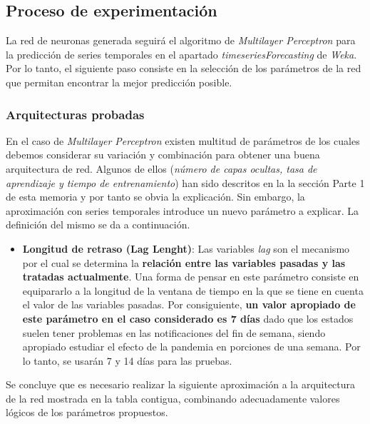 \documentclass[12pt,a4paper, xcolor=table]{article}
\begin{document}
    \subsection{Proceso de experimentación}
    La red de neuronas generada seguirá el algoritmo de \textit{Multilayer Perceptron }para la predicción de series temporales en el apartado \textit{timeseriesForecasting} de \textit{Weka}. Por lo tanto, el siguiente paso consiste en la selección de los parámetros de la red que permitan encontrar la mejor predicción posible.
    
        \subsubsection{Arquitecturas probadas}
    
        En el caso de \textit{Multilayer Perceptron } existen multitud de parámetros de los cuales debemos considerar su variación y combinación para obtener una buena arquitectura de red. Algunos de ellos (\textit{número de capas ocultas, tasa de aprendizaje y tiempo de entrenamiento}) han sido descritos en la la sección Parte 1 de esta memoria y por tanto se obvia la explicación. Sin embargo, la aproximación con series temporales introduce un nuevo parámetro a explicar. La definición del mismo se da a continuación.
    
        \begin{itemize}
        \item \textbf{Longitud de retraso (Lag Lenght)}: Las variables \textit{lag} son el mecanismo por el cual se determina la \textbf{relación entre las variables pasadas y las tratadas actualmente}. Una forma de pensar en este parámetro consiste en equipararlo a la longitud de la ventana de tiempo en la que se tiene en cuenta el valor de las variables pasadas. Por consiguiente, \textbf{un valor apropiado de este parámetro en el caso considerado es 7 días} dado que los estados suelen tener problemas en las notificaciones del fin de semana, siendo apropiado estudiar el efecto de la pandemia en porciones de una semana. Por lo tanto, se usarán 7 y 14 días para las pruebas.
        \end{itemize}
    
        Se concluye que es necesario realizar la siguiente aproximación a la arquitectura de la red mostrada en la tabla contigua, combinando adecuadamente valores lógicos de los parámetros propuestos.
    
\end{document}
